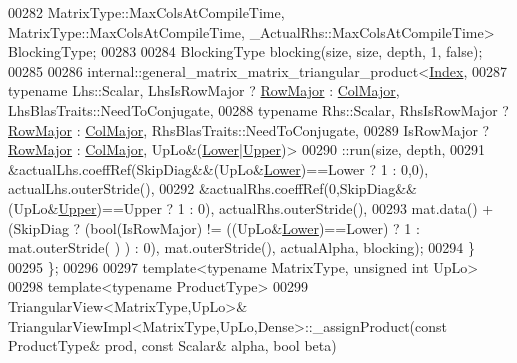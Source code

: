 \begin{DoxyCode}
00282           MatrixType::MaxColsAtCompileTime, MatrixType::MaxColsAtCompileTime, 
      \_ActualRhs::MaxColsAtCompileTime> BlockingType;
00283 
00284     BlockingType blocking(size, size, depth, 1, \textcolor{keyword}{false});
00285 
00286     internal::general\_matrix\_matrix\_triangular\_product<\hyperlink{namespace_eigen_a62e77e0933482dafde8fe197d9a2cfde}{Index},
00287       \textcolor{keyword}{typename} Lhs::Scalar, LhsIsRowMajor ? \hyperlink{group__enums_ggaacded1a18ae58b0f554751f6cdf9eb13acfcde9cd8677c5f7caf6bd603666aae3}{RowMajor} : \hyperlink{group__enums_ggaacded1a18ae58b0f554751f6cdf9eb13a0cbd4bdd0abcfc0224c5fcb5e4f6669a}{ColMajor}, 
      LhsBlasTraits::NeedToConjugate,
00288       \textcolor{keyword}{typename} Rhs::Scalar, RhsIsRowMajor ? \hyperlink{group__enums_ggaacded1a18ae58b0f554751f6cdf9eb13acfcde9cd8677c5f7caf6bd603666aae3}{RowMajor} : \hyperlink{group__enums_ggaacded1a18ae58b0f554751f6cdf9eb13a0cbd4bdd0abcfc0224c5fcb5e4f6669a}{ColMajor}, 
      RhsBlasTraits::NeedToConjugate,
00289       IsRowMajor ? \hyperlink{group__enums_ggaacded1a18ae58b0f554751f6cdf9eb13acfcde9cd8677c5f7caf6bd603666aae3}{RowMajor} : \hyperlink{group__enums_ggaacded1a18ae58b0f554751f6cdf9eb13a0cbd4bdd0abcfc0224c5fcb5e4f6669a}{ColMajor}, UpLo&(\hyperlink{group__enums_gga39e3366ff5554d731e7dc8bb642f83cda891792b8ed394f7607ab16dd716f60e6}{Lower}|\hyperlink{group__enums_gga39e3366ff5554d731e7dc8bb642f83cda6bcb58be3b8b8ec84859ce0c5ac0aaec}{Upper})>
00290       ::run(size, depth,
00291             &actualLhs.coeffRef(SkipDiag&&(UpLo&\hyperlink{group__enums_gga39e3366ff5554d731e7dc8bb642f83cda891792b8ed394f7607ab16dd716f60e6}{Lower})==Lower ? 1 : 0,0), actualLhs.outerStride(),
00292             &actualRhs.coeffRef(0,SkipDiag&&(UpLo&\hyperlink{group__enums_gga39e3366ff5554d731e7dc8bb642f83cda6bcb58be3b8b8ec84859ce0c5ac0aaec}{Upper})==Upper ? 1 : 0), actualRhs.outerStride(),
00293             mat.data() + (SkipDiag ? (bool(IsRowMajor) != ((UpLo&\hyperlink{group__enums_gga39e3366ff5554d731e7dc8bb642f83cda891792b8ed394f7607ab16dd716f60e6}{Lower})==Lower) ? 1 : mat.outerStride(
      ) ) : 0), mat.outerStride(), actualAlpha, blocking);
00294   \}
00295 \};
00296 
00297 \textcolor{keyword}{template}<\textcolor{keyword}{typename} MatrixType, \textcolor{keywordtype}{unsigned} \textcolor{keywordtype}{int} UpLo>
00298 \textcolor{keyword}{template}<\textcolor{keyword}{typename} ProductType>
00299 TriangularView<MatrixType,UpLo>& TriangularViewImpl<MatrixType,UpLo,Dense>::\_assignProduct(\textcolor{keyword}{const} 
      ProductType& prod, \textcolor{keyword}{const} Scalar& alpha, \textcolor{keywordtype}{bool} beta)

\end{DoxyCode}
